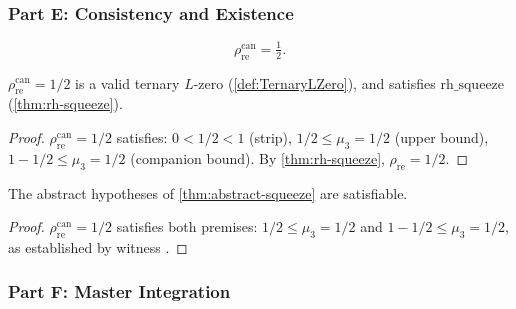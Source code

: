 \subsubsection{Part E: Consistency and Existence}

\begin{definition}\label{def:canonical-zero}
\begin{equation}\label{eq:canonical-zero}
  \rho_{\mathrm{re}}^{\mathrm{can}} = \tfrac{1}{2}.
\end{equation}
\end{definition}

\begin{proposition}%
  \label{prop:canonical-zero-works}
$\rho_{\mathrm{re}}^{\mathrm{can}} = 1/2$ is a valid ternary $L$-zero
(\cref{def:TernaryLZero}), and satisfies
$\mathrm{rh\_squeeze}$ (\cref{thm:rh-squeeze}).
\end{proposition}

\begin{proof}
$\rho_{\mathrm{re}}^{\mathrm{can}} = 1/2$ satisfies: $0<1/2<1$ (strip),
$1/2 \le \mu_3 = 1/2$ (upper bound), $1-1/2 \le \mu_3 = 1/2$
(companion bound).
By \cref{thm:rh-squeeze}, $\rho_{\mathrm{re}} = 1/2$. \checkmark
\end{proof}


\begin{proposition}%
  \label{prop:premises-satisfiable}
The abstract hypotheses of \cref{thm:abstract-squeeze} are
satisfiable.
\end{proposition}

\begin{proof}
$\rho_{\mathrm{re}}^{\mathrm{can}} = 1/2$ satisfies both premises:
$1/2 \le \mu_3 = 1/2$ and $1 - 1/2 \le \mu_3 = 1/2$, as established by witness .
\end{proof}


\subsubsection{Part F: Master Integration}

